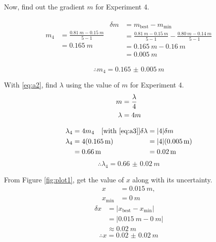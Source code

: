 \documentclass[letter]{article}
\numberwithin{equation}{section}
\numberwithin{figure}{section}
\numberwithin{table}{section}
\begin{document}
Now, find out the gradient \(m\) for Experiment 4.

\begin{align*}
  \begin{split}
    m_4 &= \frac{\SI{0.81}{m} - \SI{0.15}{m}}{5 - 1} \\
    &= \SI{0.165}{m}
  \end{split}
  \begin{split}
    \delta m &= m_{\mathrm{best}} - m_{\mathrm{min}} \\
    &= \frac{\SI{0.81}{m} - \SI{0.15}{m}}{5 - 1} - \frac{\SI{0.80}{m} - \SI{0.14}{m}}{5 - 1} \\
    &= \SI{0.165}{m} - \SI{0.16}{m} \\
    &= \SI{0.005}{m}
  \end{split}
\end{align*}

\[\therefore m_4 = \SI{0.165(5)}{m}\]

\pagebreak

With \eqref{eq:a2}, find \(\lambda\) using the value of \(m\) for Experiment 4.
\begin{align} \label{eq:a3}
  m &= \frac{\lambda}{4} \notag \\
  \lambda &= 4m
\end{align}

\nopagebreak

\begin{align*}
  \begin{split}
    \lambda_4 &= 4m_4 \quad \text{[with \eqref{eq:a3}]} \\
    \lambda_4 &= 4(\SI{0.165}{m}) \\
    &= \SI{0.66}{m}
  \end{split}
  \begin{split}
    \delta \lambda &= |4| \delta m \\
    &= |4| (\SI{0.005}{m}) \\
    &= \SI{0.02}{m}
  \end{split}
\end{align*}
\[\therefore \lambda_4 = \SI{0.66(2)}{m}\]

From Figure \ref{fig:plot1}, get the value of \(x\) along with its uncertainty.
\begin{align*}
  x &= \SI{0.015}{m}, \\
  x_\mathrm{min} &= \SI{0}{m}
\end{align*}
\begin{align*}
  \delta x &= |x_{\mathrm{best}} - x_{\mathrm{min}}| \\
  &= |\SI{0.015}{m} - \SI{0}{m}| \\
  &\approx \SI{0.02}{m}
\end{align*}
\[\therefore x = \SI{0.02(2)}{m}\]
\end{document}
